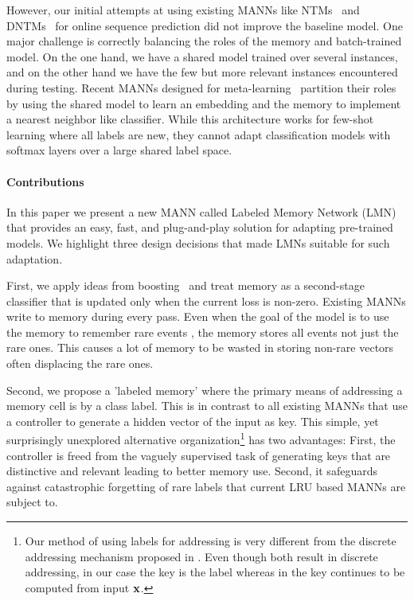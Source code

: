\documentclass[letterpaper]{article} %
\newcommand{\vek}[1]{{\bf {#1}}}
\newcommand{\vx}{{\vek{x}}}
\begin{document}
However, our initial attempts at using existing MANNs like NTMs~\cite{GravesNTM} and DNTMs~\cite{GulcehreCCB16} for online sequence prediction did not improve the baseline model. One major challenge is correctly balancing the roles of the memory and batch-trained model.   On the one hand, we have a shared model trained over several instances, and on the other hand we have the few but more relevant instances encountered during testing. Recent MANNs designed for meta-learning~\cite{SantoroBBWL16} partition their roles by using the shared model to learn an embedding and the memory to implement a nearest neighbor like classifier. While this architecture works for few-shot learning where all labels are new, they cannot adapt classification models with softmax layers over a large shared label space.


\paragraph{Contributions}
In this paper we present a new MANN called Labeled Memory Network (LMN) that provides an easy, fast, and plug-and-play solution for adapting pre-trained models.  We highlight three design decisions that made LMNs suitable for such adaptation.





First, we apply ideas from boosting~\cite{Schapire:1999adaboost} and treat memory as a second-stage classifier that is updated only when the current loss is non-zero. Existing MANNs write to memory during every pass.  Even when the goal of the model is to use the memory to remember rare events \cite{kaiser2017}, the memory stores all events not just the rare ones. This causes a lot of memory to be wasted in storing non-rare vectors often displacing the rare ones.

Second, we propose a 'labeled memory' where the primary means of addressing a memory cell is by a class label.  This is in contrast to all existing MANNs that use a controller to generate a hidden vector of the input as key.  This simple, yet surprisingly unexplored alternative organization\footnote{Our method of using labels for addressing is very different from the discrete addressing mechanism proposed in \cite{GulcehreCCB16}.  Even though both result in discrete addressing, in our case the key is the label whereas in \cite{GulcehreCCB16} the key continues to be computed from input $\vx$.} has two advantages: First, the controller is freed from the vaguely supervised task of generating keys that are distinctive and relevant leading to better memory use.  Second, it safeguards against catastrophic forgetting of rare labels that current LRU based MANNs are subject to.
\end{document}
